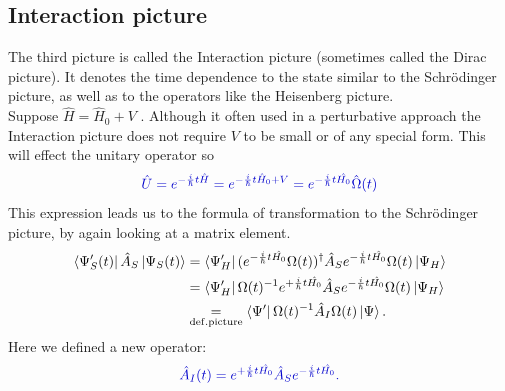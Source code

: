 \documentclass[12pt, titlepage]{article}
\begin{document}
\subsection{Interaction picture}
The third picture is called the Interaction picture (sometimes called the Dirac picture). It denotes the time dependence to the state similar to the Schrödinger picture, as well as to the operators like the Heisenberg picture.\\
Suppose $ \hat{H} = \hat{H}_{0}+V$ . Although it often used in a perturbative approach the Interaction picture does not require $ V $  to be small or of any special form. This will effect the unitary operator so 
\begin{equation}\label{eq:omega_and_U}
\textcolor[RGB]{0,0,204}{
\hat{U}=e^{-\frac{i}{\hbar}t \hat{H}}
=e^{-\frac{i}{\hbar}t \hat{H}_{0}+V}
=
e^{-\frac{i}{\hbar}t \hat{H_{0}}}
\hat{\Omega} (t)
}
\end{equation}
This expression leads us to the formula of transformation to the Schrödinger picture, by again looking at a matrix element.
\begin{subequations}
\textcolor[RGB]{0,0,0}{
\begin{align}\label{eq:matrix_ele_for_interaction}
	\bra{\Psi_{S}^{\prime}(t)}
	\hat{A}_{S}
	\ket{\Psi_{S}(t)}
  		&= 	\bra{\Psi_{H}^{\prime}}
			(e^{-\frac{i}{\hbar}t \hat{H_{0}}}	
			\Omega (t))^{\dagger}
			\hat{A}_{S}
			e^{-\frac{i}{\hbar}t \hat{H_{0}}}
			\Omega (t)
			\ket{\Psi_{H}}
  		\\
  		&= \bra{\Psi^{\prime}_{H}}
  			\Omega(t)^{-1}
			e^{+\frac{i}{\hbar}t \hat{H_{0}}}	
			\hat{A}_{S}
			e^{-\frac{i}{\hbar}t \hat{H_{0}}}
			\Omega (t)
			\ket{\Psi_{H}}
  		\\
  		&\underset{\mathrm{def.picture}}{=}
  			\bra{\Psi^{\prime}}
  			\Omega(t)^{-1}
			\hat{A}_{I}
			\Omega (t)
			\ket{\Psi}  .
\end{align}
}
\end{subequations}
Here we defined a new operator:
\begin{equation}\label{eq:operator_interac_schrodinger}
\textcolor[RGB]{0,0,204}{
	\hat{A}_{I}(t)
	=
	e^{+\frac{i}{\hbar}t \hat{H_{0}}}
	\hat{A}_{S}
	e^{-\frac{i}{\hbar}t \hat{H_{0}}}	.
}
\end{equation}
\end{document}
